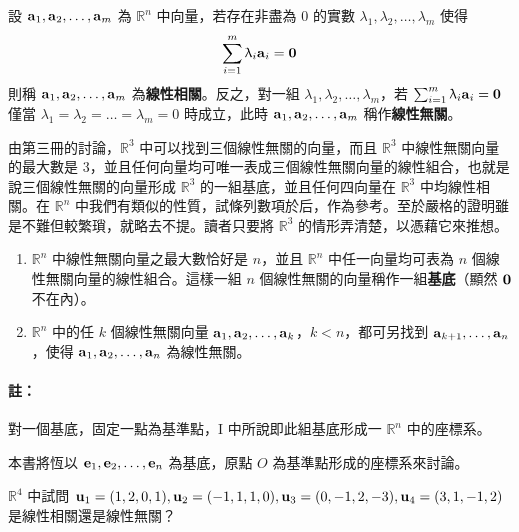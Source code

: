 \begin{definition}\label{def:b6s-1-2}
設 $\boldsymbol{\mathbf{a}}_1, \boldsymbol{\mathbf{a}}_2, \dots, \boldsymbol{\mathbf{a}}_m$ 為 $\mathbb{R}^n$ 中向量，若存在非盡為 0 的實數 $\lambda_1, \lambda_2, \dots, \lambda_m$ 使得
\begin{equation}
\sum_{i=1}^m \uplambda_i \boldsymbol{\mathbf{a}}_i = \boldsymbol{\mathbf{0}} \label{eq:b6s-1-1-8}
\end{equation}
則稱 $\boldsymbol{\mathbf{a}}_1, \boldsymbol{\mathbf{a}}_2, \dots, \boldsymbol{\mathbf{a}}_m$ 為\textbf{線性相關}。反之，對一組 $\lambda_1, \lambda_2, \dots, \lambda_m$，若 $\sum_{i=1}^m \uplambda_i \boldsymbol{\mathbf{a}}_i = \boldsymbol{\mathbf{0}}$ 僅當 $\lambda_1=\lambda_2=\dots=\lambda_m=0$ 時成立，此時 $\boldsymbol{\mathbf{a}}_1, \boldsymbol{\mathbf{a}}_2, \dots, \boldsymbol{\mathbf{a}}_m$ 稱作\textbf{線性無關}。
\end{definition}

由第三冊的討論，$\mathbb{R}^3$ 中可以找到三個線性無關的向量，而且 $\mathbb{R}^3$ 中線性無關向量的最大數是 3，並且任何向量均可唯一表成三個線性無關向量的線性組合，也就是說三個線性無關的向量形成 $\mathbb{R}^3$ 的一組基底，並且任何四向量在 $\mathbb{R}^3$ 中均線性相關。在 $\mathbb{R}^n$ 中我們有類似的性質，試條列數項於后，作為參考。至於嚴格的證明雖是不難但較繁瑣，就略去不提。讀者只要將 $\mathbb{R}^3$ 的情形弄清楚，以憑藉它來推想。
\begin{enumerate}[label=\Roman*., leftmargin=2.5em]
  \item $\mathbb{R}^n$ 中線性無關向量之最大數恰好是 $n$，並且 $\mathbb{R}^n$ 中任一向量均可表為 $n$ 個線性無關向量的線性組合。這樣一組 $n$ 個線性無關的向量稱作一組\textbf{基底}（顯然 $\boldsymbol{\mathbf{0}}$ 不在內）。
  \item $\mathbb{R}^n$ 中的任 $k$ 個線性無關向量 $\boldsymbol{\mathbf{a}}_1, \boldsymbol{\mathbf{a}}_2, \dots, \boldsymbol{\mathbf{a}}_k$，$k < n$，都可另找到 $\boldsymbol{\mathbf{a}}_{k+1}, \dots, \boldsymbol{\mathbf{a}}_n$，使得 $\boldsymbol{\mathbf{a}}_1, \boldsymbol{\mathbf{a}}_2, \dots, \boldsymbol{\mathbf{a}}_n$ 為線性無關。
\end{enumerate}

\paragraph{註：}對一個基底，固定一點為基準點，I 中所說即此組基底形成一 $\mathbb{R}^n$ 中的座標系。

本書將恆以 $\boldsymbol{\mathbf{e}}_1, \boldsymbol{\mathbf{e}}_2, \dots, \boldsymbol{\mathbf{e}}_n$ 為基底，原點 $O$ 為基準點形成的座標系來討論。

\begin{example}\label{ex:b6s-1-5}
$\mathbb{R}^4$ 中試問 $\boldsymbol{\mathbf{u}}_1=(1, 2, 0, 1), \boldsymbol{\mathbf{u}}_2=(-1, 1, 1, 0), \boldsymbol{\mathbf{u}}_3=(0, -1, 2, -3), \boldsymbol{\mathbf{u}}_4=(3, 1, -1, 2)$ 是線性相關還是線性無關？
\end{example}

